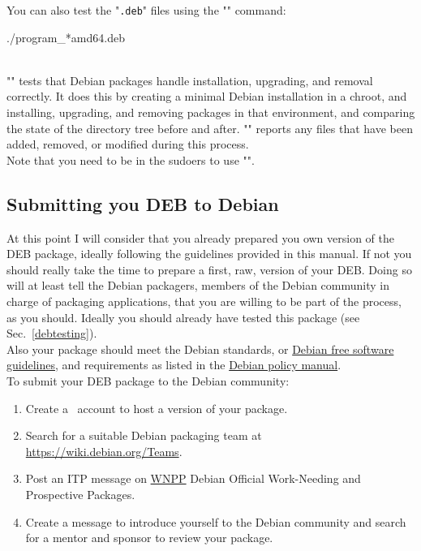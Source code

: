 You can also test the "\texttt{.deb}" files using the "" command:
\begin{script}
\uprompt{~}   ./program\_*amd64.deb 
\end{script}
\\[-0.75cm]
\noindent "" tests that Debian packages handle installation, upgrading, and removal correctly. 
It does this by creating a minimal Debian installation in a chroot, and installing, upgrading, and removing packages in that environment, and comparing the state of the directory tree before and after. "" reports any files that have been added, removed, or modified during this process. \\
Note that you need to be in the sudoers to use "".

\subsection{Submitting you DEB to Debian}

At this point I will consider that you already prepared you own version of the DEB package,
ideally following the guidelines provided in this manual. If not you should really take the time
to prepare a first, raw, version of your DEB. Doing so will at least tell the Debian
packagers, members of the Debian community in charge of packaging applications, that you are
willing to be part of the process, as you should. 
Ideally you should already have tested this package (see Sec.~\ref{debtesting}). \\
Also your package should meet the Debian standards, or \href{https://www.debian.org/social\_contract.html#guidelines}{Debian free software guidelines}, and requirements as listed in the \href{https://www.debian.org/doc/debian-policy/}{Debian policy manual}. \\
To submit your DEB package to the Debian community:
\begin{enumerate}
\item Create a \salsa\ account to host a version of your package.
\item Search for a suitable Debian packaging team at \href{https://wiki.debian.org/Teams}{https://wiki.debian.org/Teams}.
\item Post an ITP message on \href{http://www.debian.org/devel/wnpp/}{WNPP} Debian Official Work-Needing and Prospective Packages.
\item Create a message to introduce yourself to the Debian community and search for a mentor and sponsor to review your package.
\end{enumerate}

